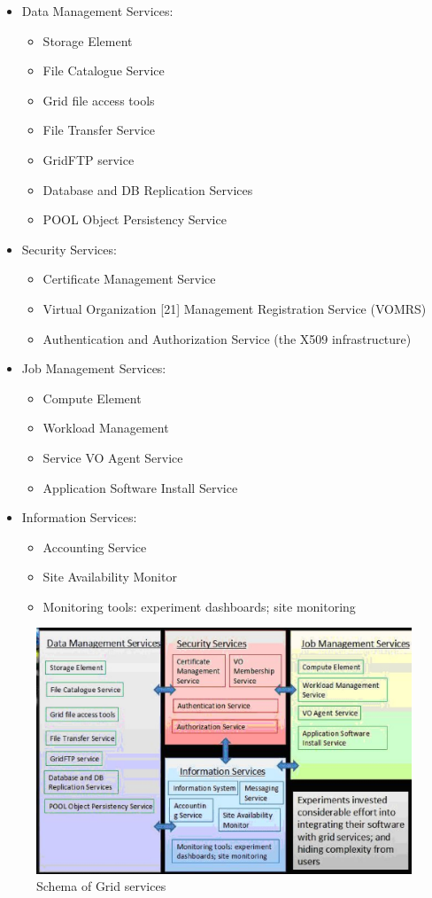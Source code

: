 \documentclass{intech}
\begin{document}
\begin{itemize}
\item Data Management Services:
%
\begin{itemize}
\item Storage Element
\item File Catalogue Service
\item Grid file access tools
\item File Transfer Service
\item GridFTP service
\item Database and DB Replication Services
\item POOL Object Persistency Service
\end{itemize}
%
\item Security Services:
%
\begin{itemize}
\item Certificate Management Service
\item Virtual Organization [21] Management Registration Service (VOMRS)
\item Authentication and Authorization Service (the X509 infrastructure)
\end{itemize}
%
\item Job Management Services:
%
\begin{itemize}
\item Compute Element
\item Workload Management
\item Service VO Agent Service
\item Application Software Install Service
\end{itemize}
%
\item Information Services:
%
\begin{itemize}
\item Accounting Service
\item Site Availability Monitor
\item Monitoring tools: experiment dashboards; site monitoring
\end{itemize}
%
\end{itemize}

\begin{figure}[htb] %
\centering
\includegraphics[width=13cm]{fig10.eps} %
\caption{Schema of Grid services}\label{fig10}
\end{figure}
\end{document}
